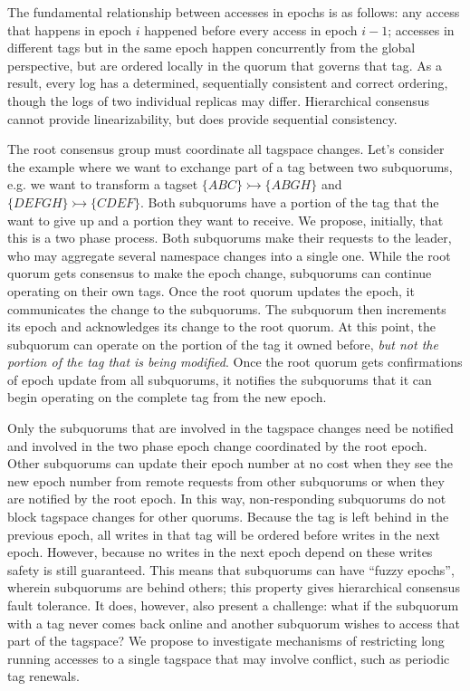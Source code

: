 \documentclass{article}
\begin{document}
The fundamental relationship between accesses in epochs is as follows: any access that happens in epoch $i$ happened before every access in epoch $i-1$; accesses in different tags but in the same epoch happen concurrently from the global perspective, but are ordered locally in the quorum that governs that tag. As a result, every log has a determined, sequentially consistent and correct ordering, though the logs of two individual replicas may differ. Hierarchical consensus cannot provide linearizability, but does provide sequential consistency.

The root consensus group must coordinate all tagspace changes. Let's consider the example where we want to exchange part of a tag between two subquorums, e.g. we want to transform a tagset $\{ABC\} \rightarrowtail \{ABGH\}$ and $\{DEFGH\} \rightarrowtail \{CDEF\}$. Both subquorums have a portion of the tag that the want to give up and a portion they want to receive. We propose, initially, that this is a two phase process. Both subquorums make their requests to the leader, who may aggregate several namespace changes into a single one. While the root quorum gets consensus to make the epoch change, subquorums can continue operating on their own tags. Once the root quorum updates the epoch, it communicates the change to the subquorums. The subquorum then increments its epoch and acknowledges its change to the root quorum. At this point, the subquorum can operate on the portion of the tag it owned before, \emph{but not the portion of the tag that is being modified}. Once the root quorum gets confirmations of epoch update from all subquorums, it notifies the subquorums that it can begin operating on the complete tag from the new epoch.

Only the subquorums that are involved in the tagspace changes need be notified and involved in the two phase epoch change coordinated by the root epoch. Other subquorums can update their epoch number at no cost when they see the new epoch number from remote requests from other subquorums or when they are notified by the root epoch. In this way, non-responding subquorums do not block tagspace changes for other quorums. Because the tag is left behind in the previous epoch, all writes in that tag will be ordered before writes in the next epoch. However, because no writes in the next epoch depend on these writes safety is still guaranteed. This means that subquorums can have ``fuzzy epochs'', wherein subquorums are behind others; this property gives hierarchical consensus fault tolerance. It does, however, also present a challenge: what if the subquorum with a tag never comes back online and another subquorum wishes to access that part of the tagspace? We propose to investigate mechanisms of restricting long running accesses to a single tagspace that may involve conflict, such as periodic tag renewals.
\end{document}
